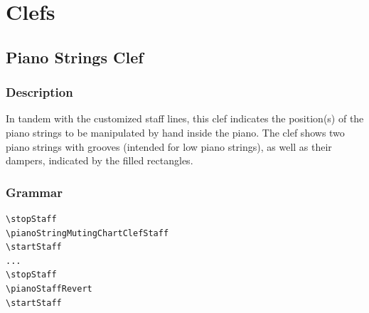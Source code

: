 

\chapter {Clefs}

\label{sec:pianoStringsClef}
\section {Piano Strings Clef}
\hfill
{}
\hfill

\subsection{Description}
In tandem with the customized staff lines, this clef indicates the position(s) of the piano strings to be manipulated by hand inside the piano. The clef shows two piano strings with grooves (intended for low piano strings), as well as their dampers, indicated by the filled rectangles. 


\subsection{Grammar}
\begin{verbatim}
\stopStaff
\pianoStringMutingChartClefStaff
\startStaff
...
\stopStaff
\pianoStaffRevert
\startStaff
\end{verbatim}
